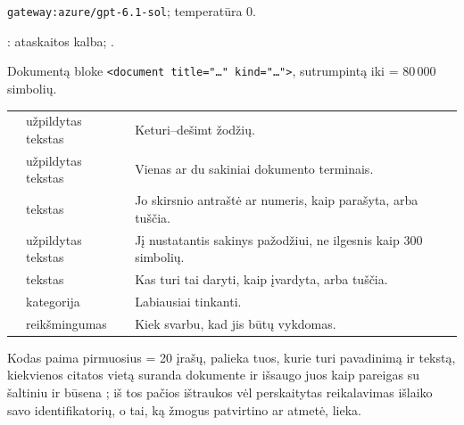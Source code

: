  \texttt{gateway:azure/gpt-6.1-sol}; temperatūra 0.

 : ataskaitos kalba; .

 Dokumentą bloke \texttt{<document title="…" kind="…">},
sutrumpintą iki  = 80\,000 simbolių.

\par\nopagebreak
\begin{xltabular}{\textwidth}{@{}L{44mm}L{22mm}Y@{}}
\toprule
{} &  &  \\
\midrule
\endhead
\bottomrule
\endlastfoot
{} & užpildytas tekstas & Keturi--dešimt žodžių. \\
 & užpildytas tekstas & Vienas ar du sakiniai dokumento terminais. \\
 & tekstas & Jo skirsnio antraštė ar numeris, kaip parašyta, arba tuščia. \\
 & užpildytas tekstas & Jį nustatantis sakinys pažodžiui, ne ilgesnis kaip 300 simbolių. \\
 & tekstas & Kas turi tai daryti, kaip įvardyta, arba tuščia. \\
 & kategorija & Labiausiai tinkanti. \\
 & reikšmingumas & Kiek svarbu, kad jis būtų vykdomas. \\
\end{xltabular}

Kodas paima pirmuosius  = 20 įrašų, palieka tuos, kurie turi
pavadinimą ir tekstą, kiekvienos citatos vietą suranda dokumente ir išsaugo juos kaip pareigas
su šaltiniu  ir būsena ; iš tos pačios ištraukos vėl perskaitytas
reikalavimas išlaiko savo identifikatorių, o tai, ką žmogus patvirtino ar atmetė, lieka.

